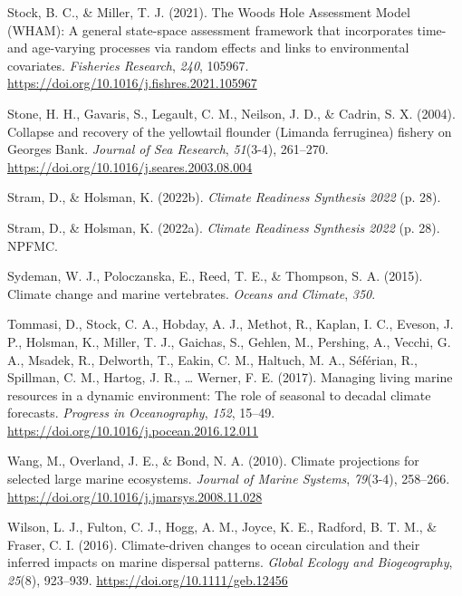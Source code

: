 \documentclass[
  12pt,
]{article}
\newlength{\cslhangindent}
\newenvironment{CSLReferences}[2] %
 {\begin{list}{}{%
  \setlength{\itemindent}{0pt}
  \setlength{\leftmargin}{0pt}
  \setlength{\parsep}{0pt}
  \ifodd #1
   \setlength{\leftmargin}{\cslhangindent}
   \setlength{\itemindent}{-1\cslhangindent}
  \fi
  \setlength{\itemsep}{#2\baselineskip}}}
 {\end{list}}
\begin{document}
\begin{CSLReferences}{1}{2}
Stock, B. C., \& Miller, T. J. (2021). The {Woods Hole Assessment Model} ({WHAM}): {A} general state-space assessment framework that incorporates time- and age-varying processes via random effects and links to environmental covariates. \emph{Fisheries Research}, \emph{240}, 105967. \url{https://doi.org/10.1016/j.fishres.2021.105967}

Stone, H. H., Gavaris, S., Legault, C. M., Neilson, J. D., \& Cadrin, S. X. (2004). Collapse and recovery of the yellowtail flounder (Limanda ferruginea) fishery on Georges Bank. \emph{Journal of Sea Research}, \emph{51}(3-4), 261--270. \url{https://doi.org/10.1016/j.seares.2003.08.004}

Stram, D., \& Holsman, K. (2022b). \emph{Climate Readiness Synthesis 2022} (p. 28).

Stram, D., \& Holsman, K. (2022a). \emph{Climate {Readiness Synthesis} 2022} (p. 28). NPFMC.

Sydeman, W. J., Poloczanska, E., Reed, T. E., \& Thompson, S. A. (2015). Climate change and marine vertebrates. \emph{Oceans and Climate}, \emph{350}.

Tommasi, D., Stock, C. A., Hobday, A. J., Methot, R., Kaplan, I. C., Eveson, J. P., Holsman, K., Miller, T. J., Gaichas, S., Gehlen, M., Pershing, A., Vecchi, G. A., Msadek, R., Delworth, T., Eakin, C. M., Haltuch, M. A., Séférian, R., Spillman, C. M., Hartog, J. R., \ldots{} Werner, F. E. (2017). Managing living marine resources in a dynamic environment: The role of seasonal to decadal climate forecasts. \emph{Progress in Oceanography}, \emph{152}, 15--49. \url{https://doi.org/10.1016/j.pocean.2016.12.011}

Wang, M., Overland, J. E., \& Bond, N. A. (2010). Climate projections for selected large marine ecosystems. \emph{Journal of Marine Systems}, \emph{79}(3-4), 258--266. \url{https://doi.org/10.1016/j.jmarsys.2008.11.028}

Wilson, L. J., Fulton, C. J., Hogg, A. M., Joyce, K. E., Radford, B. T. M., \& Fraser, C. I. (2016). Climate{-}driven changes to ocean circulation and their inferred impacts on marine dispersal patterns. \emph{Global Ecology and Biogeography}, \emph{25}(8), 923--939. \url{https://doi.org/10.1111/geb.12456}

\end{CSLReferences}
\end{document}
